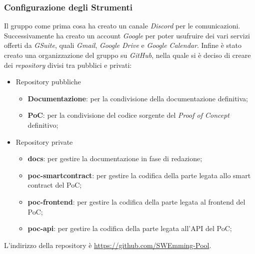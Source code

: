         \subsubsection{Configurazione degli Strumenti}
            Il gruppo come prima cosa ha creato un canale \textit{Discord} per le comunicazioni.
            Successivamente ha creato un account \textit{Google} per poter usufruire dei vari servizi offerti da \textit{GSuite}, quali \textit{Gmail}, \textit{Google Drive} e \textit{Google Calendar}.
            Infine è stato creato una organizzazione del gruppo su \textit{GitHub}, nella quale si è deciso di creare dei \textit{repository} divisi tra pubblici e privati:
            \begin{itemize}
                \item Repository pubbliche
                \begin{itemize}
                    \item \textbf{Documentazione}: per la condivisione della documentazione definitiva;
                    \item \textbf{PoC}: per la condivisione del codice sorgente del \textit{Proof of Concept} definitivo;
                \end{itemize}
                \item Repository private
                \begin{itemize}
                    \item \textbf{docs}: per gestire la documentazione in fase di redazione;
                    \item \textbf{poc-smartcontract}: per gestire la codifica della parte legata allo smart contract del PoC;
                    \item \textbf{poc-frontend}: per gestire la codifica della parte legata al frontend del PoC;
                    \item \textbf{poc-api}: per gestire la codifica della parte legata all'API del PoC;
                \end{itemize}
            \end{itemize}
            L'indirizzo della repository è \href{https://github.com/SWEmming-Pool}{https://github.com/SWEmming-Pool}.

